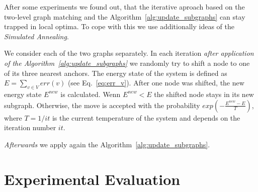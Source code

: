 \documentclass[
	fontsize=12pt,
	paper=a4,
	twoside=false,
	numbers=noenddot,
	plainheadsepline,
	toc=listof,
	toc=bibliography
]{scrartcl}
\begin{document}
After some experiments we found out, that the iterative aproach based on the two-level graph matching and the Algorithm~\ref{alg:update_subgraphs} can stay trapped in local optima.
To cope with this we use additionally ideas of the \emph{Simulated Annealing}.

We consider each of the two graphs separately. In each iteration \emph{after application of the Algorithm~\ref{alg:update_subgraphs}} we randomly try to shift a node to one of its three nearest anchors. The energy state of the system is defined as $E = \sum_{v\in V}err(v)$ (see Eq.~\ref{eq:err_v}). After one node was shifted, the new energy state $E^{new}$ is calculated. Wenn $E^{new}<E$ the shifted node stays in its new subgraph. Otherwise, the move is accepted with the probability $exp(-\frac{E^{new}-E}{T})$, where $T = 1/{it}$ is the current temperature of the system and depends on the iteration number $it$. 

\emph{Afterwards} we apply again the Algorithm~\ref{alg:update_subgraphs}.

\section{Experimental Evaluation}
\end{document}
